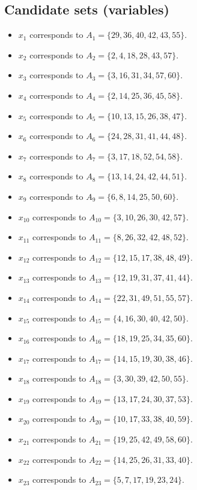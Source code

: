 \documentclass[11pt]{article}
\begin{document}
\subsection*{Candidate sets (variables)}
\begin{itemize}
\item $x_{1}$ corresponds to $A_{1}=\{29, 36, 40, 42, 43, 55\}$.
\item $x_{2}$ corresponds to $A_{2}=\{2, 4, 18, 28, 43, 57\}$.
\item $x_{3}$ corresponds to $A_{3}=\{3, 16, 31, 34, 57, 60\}$.
\item $x_{4}$ corresponds to $A_{4}=\{2, 14, 25, 36, 45, 58\}$.
\item $x_{5}$ corresponds to $A_{5}=\{10, 13, 15, 26, 38, 47\}$.
\item $x_{6}$ corresponds to $A_{6}=\{24, 28, 31, 41, 44, 48\}$.
\item $x_{7}$ corresponds to $A_{7}=\{3, 17, 18, 52, 54, 58\}$.
\item $x_{8}$ corresponds to $A_{8}=\{13, 14, 24, 42, 44, 51\}$.
\item $x_{9}$ corresponds to $A_{9}=\{6, 8, 14, 25, 50, 60\}$.
\item $x_{10}$ corresponds to $A_{10}=\{3, 10, 26, 30, 42, 57\}$.
\item $x_{11}$ corresponds to $A_{11}=\{8, 26, 32, 42, 48, 52\}$.
\item $x_{12}$ corresponds to $A_{12}=\{12, 15, 17, 38, 48, 49\}$.
\item $x_{13}$ corresponds to $A_{13}=\{12, 19, 31, 37, 41, 44\}$.
\item $x_{14}$ corresponds to $A_{14}=\{22, 31, 49, 51, 55, 57\}$.
\item $x_{15}$ corresponds to $A_{15}=\{4, 16, 30, 40, 42, 50\}$.
\item $x_{16}$ corresponds to $A_{16}=\{18, 19, 25, 34, 35, 60\}$.
\item $x_{17}$ corresponds to $A_{17}=\{14, 15, 19, 30, 38, 46\}$.
\item $x_{18}$ corresponds to $A_{18}=\{3, 30, 39, 42, 50, 55\}$.
\item $x_{19}$ corresponds to $A_{19}=\{13, 17, 24, 30, 37, 53\}$.
\item $x_{20}$ corresponds to $A_{20}=\{10, 17, 33, 38, 40, 59\}$.
\item $x_{21}$ corresponds to $A_{21}=\{19, 25, 42, 49, 58, 60\}$.
\item $x_{22}$ corresponds to $A_{22}=\{14, 25, 26, 31, 33, 40\}$.
\item $x_{23}$ corresponds to $A_{23}=\{5, 7, 17, 19, 23, 24\}$.

\end{itemize}
\end{document}
